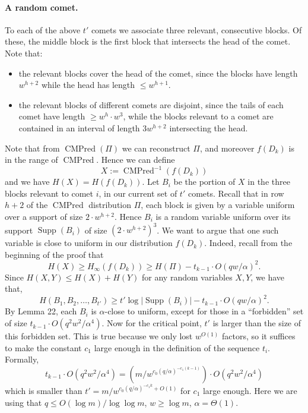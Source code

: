 \documentclass[10pt,a4paper]{article}
\begin{document}
\paragraph{A random comet.}
To each of the above $t'$ comets we associate three relevant, consecutive blocks. Of these, the middle block is the first block that intersects the head of the comet. Note that:
\begin{itemize}
\item the relevant blocks cover the head of the comet, since the blocks have length $w^{h+2}$ while the head has length $\leq w^{h+1}$.
\item the relevant blocks of different comets are disjoint, since the tails of each comet have length $\geq w^h\cdot w^3$, while the blocks relevant to a comet are contained in an interval of length $3w^{h+2}$ intersecting the head.
\end{itemize}
Note that from $\operatorname{CMPred}(\Pi)$ we can reconstruct $\Pi$, and moreover $f(D_k)$ is in the range of $\operatorname{CMPred}$. Hence we can define
\[X:=\operatorname{CMPred}^{-1}(f(D_k))\]
and we have $H(X)=H(f(D_k))$. Let $B_i$ be the portion of $X$ in the three blocks relevant to comet $i$, in our current set of $t'$ comets. Recall that in row $h+2$ of the $\operatorname{CMPred}$ distribution $\Pi$, each block is given by a variable uniform over a support of size $2\cdot w^{h+2}$. Hence $B_i$ is a random variable uniform over its support $\operatorname{Supp}(B_i)$ of size $(2\cdot w^{h+2})^3$.
We want to argue that one such variable is close to uniform in our distribution $f(D_k)$. Indeed, recall from the beginning of the proof that
\[H(X)\geq H_\infty(f(D_k))\geq H(\Pi)-t_{k-1}\cdot O(qw/\alpha)^2.\]
Since $H(X,Y)\leq H(X)+H(Y)$ for any random variables $X,Y$, we have that,
\[H(B_1,B_2,\ldots,B_{t'})\geq t'\log|\operatorname{Supp}(B_i)|-t_{k-1}\cdot O(qw/\alpha)^2.\]
By Lemma 22, each $B_i$ is $\alpha$-close to uniform, except for those in a ``forbidden'' set of size $t_{k-1}\cdot O(q^2w^2/\alpha^4)$.
Now for the critical point, $t'$ is larger than the size of this forbidden set. This is true because we only lost $w^{O(1)}$ factors, so it suffices to make the constant $c_1$ large enough in the definition of the sequence $t_i$. Formally,
\[t_{k-1}\cdot O(q^2w^2/\alpha^4)=(m/w^{c_0(q/\alpha)^{-c_1(k-1)}})\cdot O(q^2w^2/\alpha^4)\]
which is smaller than $t'=m/w^{c_0(q/\alpha)^{-c_1k}+O(1)}$ for $c_1$ large enough. Here we are using that $q\leq O(\log m)/\log\log m$, $w\geq\log m$, $\alpha=\Theta(1)$.
\end{document}
